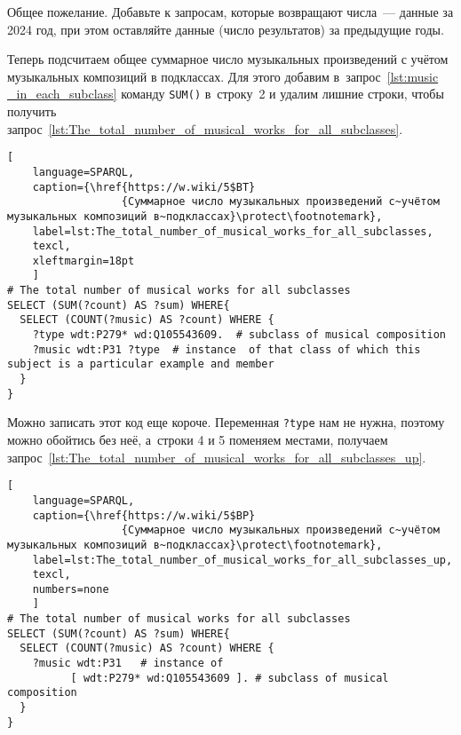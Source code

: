 \TODO Общее пожелание. Добавьте к запросам, которые возвращают числа~--- данные за 2024 год, 
при этом оставляйте данные (число результатов) за предыдущие годы.

Теперь подсчитаем общее суммарное число музыкальных произведений с учётом музыкальных композиций в подклассах. Для этого добавим в~запрос~\ref{lst:music _in_each_subclass} команду \lstinline|SUM()| в~строку~2 и удалим лишние строки, чтобы получить запрос~\ref{lst:The_total_number_of_musical_works_for_all_subclasses}.


\begin{lstlisting}[ 
    language=SPARQL,
    caption={\href{https://w.wiki/5$BT}
                  {Суммарное число музыкальных произведений с~учётом музыкальных композиций в~подклассах}\protect\footnotemark},
    label=lst:The_total_number_of_musical_works_for_all_subclasses,
    texcl,  
    xleftmargin=18pt
    ]
# The total number of musical works for all subclasses 
SELECT (SUM(?count) AS ?sum) WHERE{
  SELECT (COUNT(?music) AS ?count) WHERE {
    ?type wdt:P279* wd:Q105543609.  # subclass of musical composition
    ?music wdt:P31 ?type  # instance  of that class of which this subject is a particular example and member
  }
}
\end{lstlisting}%

Можно записать этот код еще короче. 
Переменная \lstinline|?type| нам не нужна, поэтому можно обойтись без неё, 
а~строки 4 и 5 поменяем местами, получаем запрос~\ref{lst:The_total_number_of_musical_works_for_all_subclasses_up}.

\begin{lstlisting}[ 
    language=SPARQL,
    caption={\href{https://w.wiki/5$BP}
                  {Суммарное число музыкальных произведений с~учётом музыкальных композиций в~подклассах}\protect\footnotemark},
    label=lst:The_total_number_of_musical_works_for_all_subclasses_up,
    texcl,
    numbers=none
    ]
# The total number of musical works for all subclasses 
SELECT (SUM(?count) AS ?sum) WHERE{
  SELECT (COUNT(?music) AS ?count) WHERE {
    ?music wdt:P31   # instance of
          [ wdt:P279* wd:Q105543609 ]. # subclass of musical composition
  }
}
\end{lstlisting}%

